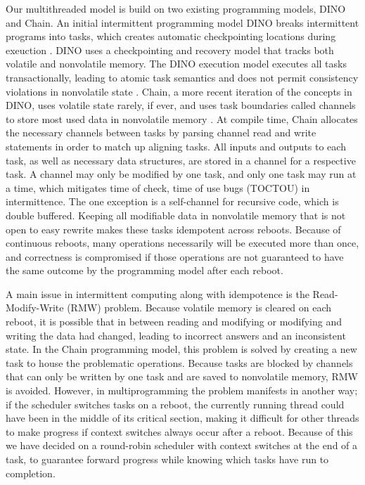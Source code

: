 \documentclass[11pt]{sensys-proc}
\begin{document}
Our multithreaded model is build on two existing programming models, DINO and Chain.
An initial intermittent programming model DINO breaks intermittent programs into tasks, which creates automatic checkpointing locations
during exeuction \cite{Dino}. DINO uses a checkpointing and recovery model that tracks both volatile and nonvolatile memory.
The DINO execution model executes all tasks transactionally, leading to atomic task semantics and does not permit consistency violations in
nonvolatile state \cite{Dino}. Chain, a more recent iteration of the concepts in DINO, uses volatile state rarely, if ever, and uses task boundaries
called channels to store most used data in nonvolatile memory \cite{Chain}. At compile time, Chain allocates the necessary channels between tasks
by parsing channel read and write statements in order to match up aligning tasks. All inputs and outputs to each task, as well as necessary data
structures, are stored in a channel for a respective task. A channel may only be modified by one task, and only one task may run at a time,
which mitigates time of check, time of use bugs (TOCTOU) in intermittence.
The one exception is a self-channel for recursive code, which is double buffered.
Keeping all modifiable data in nonvolatile memory that is not open to easy rewrite makes these tasks idempotent across reboots.
Because of continuous reboots, many operations necessarily will be executed more than once,
and correctness is compromised if those operations are not guaranteed to have the same outcome by the programming model after each reboot.

A main issue in intermittent computing along with idempotence is the Read-Modify-Write (RMW) problem.
Because volatile memory is cleared on each reboot, it is possible that in between reading and modifying or modifying and writing the data had changed,
leading to incorrect answers and an inconsistent state. In the Chain programming model, this problem is solved by creating a new task to house the
problematic operations. Because tasks are blocked by channels that can only be written by one task and are saved to nonvolatile memory, RMW is avoided.
However, in multiprogramming the problem manifests in another way; if the scheduler switches tasks on a reboot, the currently running thread could have
been in the middle of its critical section, making it difficult for other threads to make progress if context switches always occur after a reboot.
Because of this we have decided on a round-robin scheduler with context switches at the end of a task, to guarantee forward progress while knowing
which tasks have run to completion.
\end{document}
